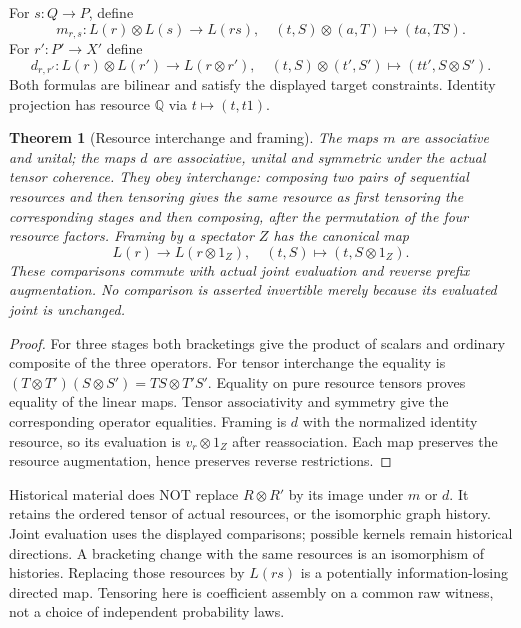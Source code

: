 \documentclass{article}
\newtheorem{theorem}{Theorem}\newtheorem{proposition}{Proposition}
\begin{document}
For $s:Q\to P$, define
\[
 m_{r,s}:L(r)\otimes L(s)\to L(rs),\quad
 (t,S)\otimes(a,T)\mapsto(ta,TS).
\]
For $r':P'\to X'$ define
\[
 d_{r,r'}:L(r)\otimes L(r')\to L(r\otimes r'),\quad
 (t,S)\otimes(t',S')\mapsto(tt',S\otimes S').
\]
Both formulas are bilinear and satisfy the displayed target constraints. Identity projection has resource $\mathbb Q$ via $t\mapsto(t,t1)$.

\begin{theorem}[Resource interchange and framing]
The maps $m$ are associative and unital; the maps $d$ are associative, unital and symmetric under the actual tensor coherence. They obey interchange: composing two pairs of sequential resources and then tensoring gives the same resource as first tensoring the corresponding stages and then composing, after the permutation of the four resource factors. Framing by a spectator $Z$ has the canonical map
\[
 L(r)\to L(r\otimes1_Z),\quad(t,S)\mapsto(t,S\otimes1_Z).
\]
These comparisons commute with actual joint evaluation and reverse prefix augmentation. No comparison is asserted invertible merely because its evaluated joint is unchanged.
\end{theorem}
\begin{proof}
For three stages both bracketings give the product of scalars and ordinary composite of the three operators. For tensor interchange the equality is
$(T\otimes T')(S\otimes S')=TS\otimes T'S'$. Equality on pure resource tensors proves equality of the linear maps. Tensor associativity and symmetry give the corresponding operator equalities. Framing is $d$ with the normalized identity resource, so its evaluation is $v_r\otimes1_Z$ after reassociation. Each map preserves the resource augmentation, hence preserves reverse restrictions.\end{proof}

Historical material does NOT replace $R\otimes R'$ by its image under $m$ or $d$. It retains the ordered tensor of actual resources, or the isomorphic graph history. Joint evaluation uses the displayed comparisons; possible kernels remain historical directions. A bracketing change with the same resources is an isomorphism of histories. Replacing those resources by $L(rs)$ is a potentially information-losing directed map. Tensoring here is coefficient assembly on a common raw witness, not a choice of independent probability laws.
\end{document}
